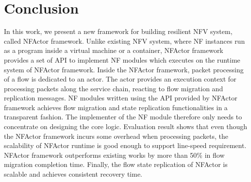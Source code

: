 \section{Conclusion}
\label{sec:conclusion}

In this work, we present a new framework for building resilient NFV system, called NFActor framework. Unlike existing NFV system, where NF instances run as a program inside a virtual machine or a container, NFActor framework provides a set of API to implement NF modules which executes on the runtime system of NFActor framework. Inside the NFActor framework, packet processing of a flow is dedicated to an actor. The actor provides an execution context for processing packets along the service chain, reacting to flow migration and replication messages. NF modules written using the API provided by NFActor framework achieves flow migration and state replication functionalities in a transparent fashion. The implementer of the NF module therefore only needs to concentrate on designing the core logic. Evaluation result shows that even though the NFActor framework incurs some overhead when processing packets, the scalability of NFActor runtime is good enough to support line-speed requirement. NFActor framework outperforms existing works by more than 50\% in flow migration completion time. Finally, the flow state replication of NFActor is scalable and achieves consistent recovery time.